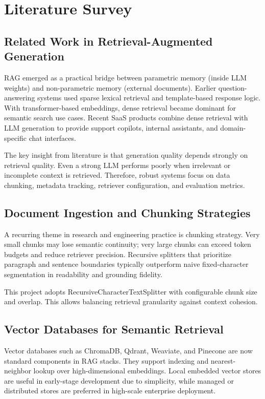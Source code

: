 \documentclass[12pt,letterpaper]{report}
\begin{document}
\chapter{Literature Survey}

\section{Related Work in Retrieval-Augmented Generation}
RAG emerged as a practical bridge between parametric memory (inside LLM weights) and non-parametric memory (external documents). Earlier question-answering systems used sparse lexical retrieval and template-based response logic. With transformer-based embeddings, dense retrieval became dominant for semantic search use cases. Recent SaaS products combine dense retrieval with LLM generation to provide support copilots, internal assistants, and domain-specific chat interfaces.

The key insight from literature is that generation quality depends strongly on retrieval quality. Even a strong LLM performs poorly when irrelevant or incomplete context is retrieved. Therefore, robust systems focus on data chunking, metadata tracking, retriever configuration, and evaluation metrics.

\section{Document Ingestion and Chunking Strategies}
A recurring theme in research and engineering practice is chunking strategy. Very small chunks may lose semantic continuity; very large chunks can exceed token budgets and reduce retriever precision. Recursive splitters that prioritize paragraph and sentence boundaries typically outperform naive fixed-character segmentation in readability and grounding fidelity.

This project adopts RecursiveCharacterTextSplitter with configurable chunk size and overlap. This allows balancing retrieval granularity against context cohesion.

\section{Vector Databases for Semantic Retrieval}
Vector databases such as ChromaDB, Qdrant, Weaviate, and Pinecone are now standard components in RAG stacks. They support indexing and nearest-neighbor lookup over high-dimensional embeddings. Local embedded vector stores are useful in early-stage development due to simplicity, while managed or distributed stores are preferred in high-scale enterprise deployment.
\end{document}
